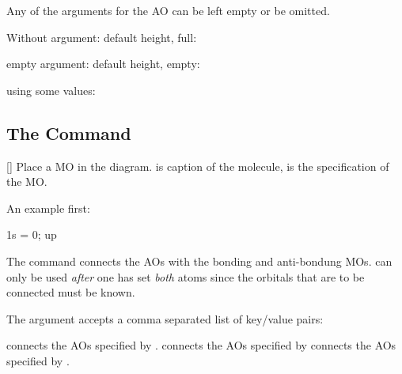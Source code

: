 \documentclass[load-preamble+]{cnltx-doc}
\begin{document}
Any of the arguments for the \ac{AO} can be left empty or be omitted.
\begin{example}
  Without argument: default height, full:\par
  \begin{MOdiagram}
  \end{MOdiagram}
\end{example}

\begin{example}
  empty argument: default height, empty:\par
  \begin{MOdiagram}
  \end{MOdiagram}
\end{example}

\begin{example}
  using some values:\par
  \begin{MOdiagram}
  \end{MOdiagram}
\end{example}

\subsection{The  Command}\label{ssec:molecule}
\begin{commands}
  []
    Place a \acs{MO} in the diagram.  is caption of the molecule,
     is the specification of the \ac{MO}.
\end{commands}

An example first:
\begin{example}
  \begin{MOdiagram}
     { 1s = {  0; up } }
  \end{MOdiagram}
\end{example}
The command  connects the \acp{AO} with the bonding and
anti-bondung \acp{MO}.   can only be used \emph{after} one has
set \emph{both} atoms since the orbitals that are to be connected must be
known.

The argument  accepts a comma separated list of key/value pairs:
\begin{options}
    connects the \acp{AO} specified by .
    connects the \acp{AO} specified by 
    connects the \acp{AO} specified by .
\end{options}
\end{document}
